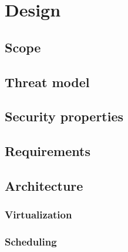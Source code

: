 \chapter{Design}
\section{Scope}
\section{Threat model}
\section{Security properties}
\section{Requirements}
\section{Architecture}
\subsection{Virtualization}
\subsection{Scheduling}
